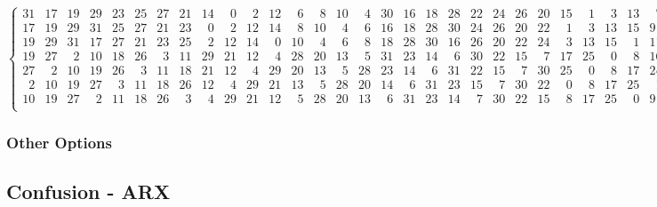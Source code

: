 \documentclass[fleqn, a4paper,12pt]{article}
\begin{document}
\[\begin{Bmatrix}
31 & 17 & 19 & 29 & 23 & 25 & 27 & 21 & 14 & \phantom{0}0 & \phantom{0}2 & 12 & \phantom{0}6 & \phantom{0}8 & 10 & \phantom{0}4 & 30 & 16 & 18 & 28 & 22 & 24 & 26 & 20 & 15 & \phantom{0}1 & \phantom{0}3 & 13 & \phantom{0}7 & 9 & 11 & \phantom{0}5 \\
17 & 19 & 29 & 31 & 25 & 27 & 21 & 23 & \phantom{0}0 & \phantom{0}2 & 12 & 14 & \phantom{0}8 & 10 & \phantom{0}4 & \phantom{0}6 & 16 & 18 & 28 & 30 & 24 & 26 & 20 & 22 & \phantom{0}1 & \phantom{0}3 & 13 & 15 & 9 & 11 & \phantom{0}5 & \phantom{0}7 \\
19 & 29 & 31 & 17 & 27 & 21 & 23 & 25 & \phantom{0}2 & 12 & 14 & \phantom{0}0 & 10 & \phantom{0}4 & \phantom{0}6 & \phantom{0}8 & 18 & 28 & 30 & 16 & 26 & 20 & 22 & 24 & \phantom{0}3 & 13 & 15 & \phantom{0}1 & 11 & \phantom{0}5 & \phantom{0}7 & 9 \\
19 & 27 & \phantom{0}2 & 10 & 18 & 26 & \phantom{0}3 & 11 & 29 & 21 & 12 & \phantom{0}4 & 28 & 20 & 13 & \phantom{0}5 & 31 & 23 & 14 & \phantom{0}6 & 30 & 22 & 15 & \phantom{0}7 & 17 & 25 & \phantom{0}0 & \phantom{0}8 & 16 & 24 & \phantom{0}1 & 9 \\
27 & \phantom{0}2 & 10 & 19 & 26 & \phantom{0}3 & 11 & 18 & 21 & 12 & \phantom{0}4 & 29 & 20 & 13 & \phantom{0}5 & 28 & 23 & 14 & \phantom{0}6 & 31 & 22 & 15 & \phantom{0}7 & 30 & 25 & \phantom{0}0 & \phantom{0}8 & 17 & 24 & \phantom{0}1 & 9 & 16 \\
\phantom{0}2 & 10 & 19 & 27 & \phantom{0}3 & 11 & 18 & 26 & 12 & \phantom{0}4 & 29 & 21 & 13 & \phantom{0}5 & 28 & 20 & 14 & \phantom{0}6 & 31 & 23 & 15 & \phantom{0}7 & 30 & 22 & \phantom{0}0 & \phantom{0}8 & 17 & 25 & \phantom{0}1 & 9 & 16 & 24 \\
10 & 19 & 27 & \phantom{0}2 & 11 & 18 & 26 & \phantom{0}3 & \phantom{0}4 & 29 & 21 & 12 & \phantom{0}5 & 28 & 20 & 13 & \phantom{0}6 & 31 & 23 & 14 & \phantom{0}7 & 30 & 22 & 15 & \phantom{0}8 & 17 & 25 & \phantom{0}0 & 9 & 16 & 24 & \phantom{0}1 \\
\end{Bmatrix}
\]

\subsubsection{Other Options} %

\subsection{Confusion - ARX}
\end{document}
